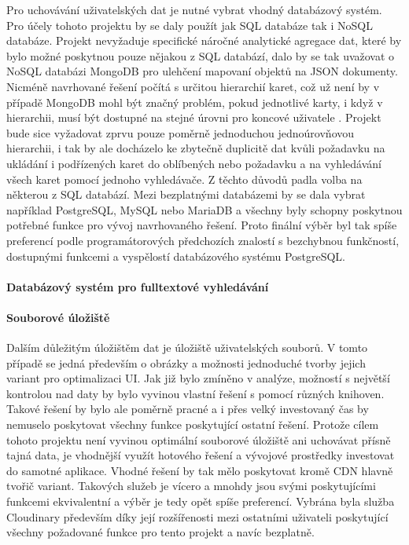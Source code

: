 			Pro uchovávání uživatelských dat je nutné vybrat vhodný databázový systém.
			Pro účely tohoto projektu by se daly použít jak \ac{SQL} databáze tak i \ac{NoSQL} databáze.
			Projekt nevyžaduje specifické náročné analytické agregace dat, které by bylo možné poskytnou pouze nějakou z
			\ac{SQL} databází, dalo by se tak uvažovat o \ac{NoSQL} databázi MongoDB pro ulehčení mapovaní objektů na
			\ac{JSON} dokumenty.
			Nicméně navrhované řešení počítá s určitou hierarchií karet, což už není by v případě MongoDB mohl být značný
			problém, pokud jednotlivé karty, i když v hierarchii, musí být dostupné na stejné úrovni pro koncové uživatele
			\cite{why_you_should_never_use_mongodb}.
			Projekt bude sice vyžadovat zprvu pouze poměrně jednoduchou jednoúrovňovou hierarchii, i tak by ale docházelo ke
			zbytečně duplicitě dat kvůli požadavku na ukládání i podřízených karet do oblíbených nebo požadavku a na vyhledávání
			všech karet pomocí jednoho vyhledávače.
			Z těchto důvodů padla volba na některou z \ac{SQL} databází.
			Mezi bezplatnými databázemi by se dala vybrat například PostgreSQL, MySQL nebo MariaDB a všechny byly schopny
			poskytnou potřebné funkce pro vývoj navrhovaného řešení.
			Proto finální výběr byl tak spíše preferencí podle programátorových předchozích znalostí s bezchybnou funkčností,
			dostupnými funkcemi a vyspělostí databázového systému PostgreSQL.

			\paragraph{Databázový systém pro fulltextové vyhledávání}


			\paragraph{Souborové úložiště}

			Dalším důležitým úložištěm dat je úložiště uživatelských souborů.
			V tomto případě se jedná především o obrázky a možnosti jednoduché tvorby jejich variant pro optimalizaci \ac{UI}.
			Jak již bylo zmíněno v analýze, možností s největší kontrolou nad daty by bylo vyvinou vlastní řešení s pomocí
			různých knihoven.
			Takové řešení by bylo ale poměrně pracné a i přes velký investovaný čas by nemuselo poskytovat všechny funkce
			poskytující ostatní řešení.
			Protože cílem tohoto projektu není vyvinou optimální souborové úložiště ani uchovávat přísně tajná data, je
			vhodnější využít hotového řešení a vývojové prostředky investovat do samotné aplikace.
			Vhodné řešení by tak mělo poskytovat kromě \ac{CDN} hlavně tvořič variant.
			Takových služeb je vícero a mnohdy jsou svými poskytujícími funkcemi ekvivalentní a výběr je tedy opět spíše
			preferencí.
			Vybrána byla služba Cloudinary především díky její rozšířenosti mezi ostatními uživateli poskytující všechny
			požadované funkce pro tento projekt a navíc bezplatně.

